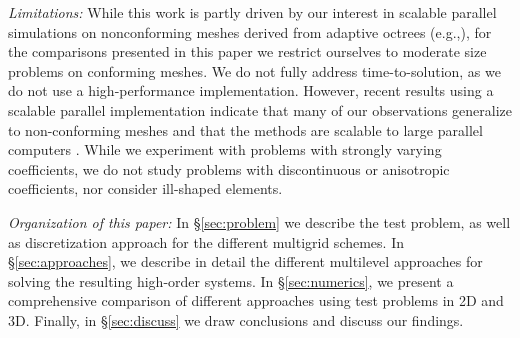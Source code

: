 \documentclass[smallcondensed,final]{svjour3}     %
\newcommand{\gsnote}[1]{\textcolor{blue}{GS: #1}}
\begin{document}






{\em Limitations:} While this work is partly driven by our interest in
scalable parallel simulations on nonconforming meshes derived from
adaptive octrees (e.g.,\cite{SundarBirosBursteddeEtAl12,
  SampathBiros10, BursteddeGhattasGurnisEtAl10}), for the comparisons
presented in this paper we restrict ourselves to moderate size
problems on conforming meshes. We do not fully address time-to-solution, as
we do not use a high-performance implementation. However, recent
results using a scalable parallel implementation indicate that many of
our observations generalize to non-conforming meshes and that the
methods are scalable to large parallel computers \cite{IPDPS14}. While we
experiment with problems with strongly varying coefficients, we do not
study problems with discontinuous or anisotropic coefficients, nor consider
ill-shaped elements.

{\em Organization of this paper:} In \S\ref{sec:problem} we describe
the test problem, as well as discretization approach for the different
multigrid schemes. In \S\ref{sec:approaches}, we describe in detail
the different multilevel approaches for solving the resulting
high-order systems. In \S\ref{sec:numerics}, we present a
comprehensive comparison of different approaches using test problems
in 2D and 3D. Finally, in \S\ref{sec:discuss} we draw conclusions and
discuss our findings.



\end{document}
